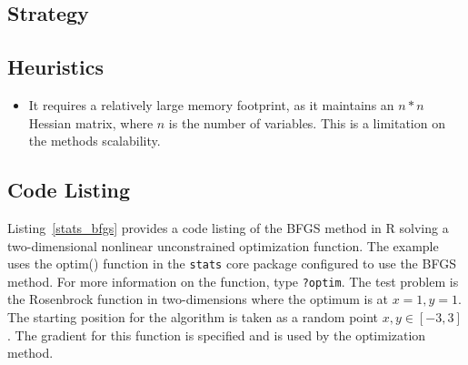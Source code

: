 \subsection{Strategy}


\subsection{Heuristics}

\begin{itemize}
	\item It requires a relatively large memory footprint, as it maintains an $n*n$ Hessian matrix, where $n$ is the number of variables. This is a limitation on the methods scalability.
\end{itemize}

\subsection{Code Listing}
Listing~\ref{stats_bfgs} provides a code listing of the BFGS method in R solving a two-dimensional nonlinear unconstrained optimization function.
The example uses the {optim()} function in the \texttt{stats} core package configured to use the BFGS method. For more information on the function, type \texttt{?optim}.
The test problem is the Rosenbrock function in two-dimensions where the optimum is at $x=1, y=1$. The starting position for the algorithm is taken as a random point $x,y \in [-3,3]$. The gradient for this function is specified and is used by the optimization method.




